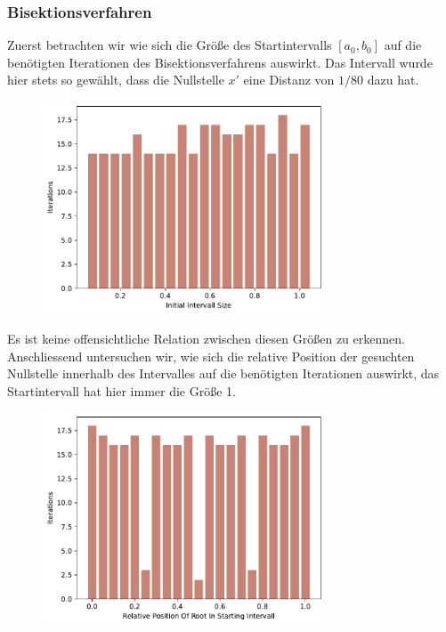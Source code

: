 \documentclass[a4paper,12pt]{article}
\newcommand{\1}{1\hspace{-0,9ex}1}
\begin{document}
\subsubsection*{Bisektionsverfahren}
Zuerst betrachten wir wie sich die Größe des Startintervalls $[a_0, b_0]$ auf die benötigten Iterationen des Bisektionsverfahrens auswirkt. Das Intervall wurde hier stets so gewählt, dass die Nullstelle $x'$ eine Distanz von $1/80$ dazu hat.

\begin{figure}[H]
	\centering
	\includegraphics[width=0.75\textwidth]{plots/bisection_iterations_by_intervall_size.pdf}
\end{figure}

Es ist keine offensichtliche Relation zwischen diesen Größen zu erkennen. Anschliessend untersuchen wir, wie sich die relative Position der gesuchten Nullstelle innerhalb des Intervalles auf die benötigten Iterationen auswirkt, das Startintervall hat hier immer die Größe 1.

\begin{figure}[H]
	\centering
	\includegraphics[width=0.75\textwidth]{plots/bisection_iterations_by_relative_position_of_root.pdf}
\end{figure}
\end{document}
